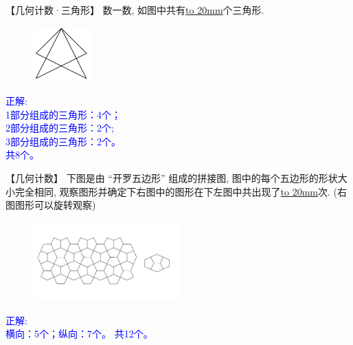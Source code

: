 \item {
    【几何计数·三角形】
    数一数, 如图中共有\underline{\hbox to 20mm{}}个三角形.
    \begin{figure}[H] 
        \centering
        \includegraphics[width=0.2\textwidth]{./pics/Chapter_4/2015_2.png}
    \end{figure}
    \ifshowSolution 
        \fangsong{}\textcolor{blue}{
            正解: \\
            1部分组成的三角形：4个；\\
            2部分组成的三角形：2个;\\
            3部分组成的三角形：2个。\\
            共8个。
        }
    \else
        \vspace{1cm}
    \fi
}

\item {
    【几何计数】
    下图是由 ``开罗五边形'' 组成的拼接图, 图中的每个五边形的形状大小完全相同, 观察图形并确定下右图中的图形在下左图中共出现了\underline{\hbox to 20mm{}}次. (右图图形可以旋转观察)
    \begin{figure}[H] 
        \centering
        \includegraphics[width=0.5\textwidth]{./pics/Chapter_4/8.png}
    \end{figure}
    \ifshowSolution 
        \fangsong{}\textcolor{blue}{
            正解: \\
            横向：5个；纵向：7个。
            共12个。
        }
    \else
        \vspace{1cm}
    \fi
}

